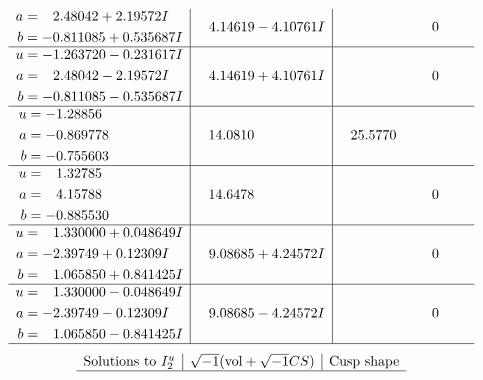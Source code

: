 \documentclass[1p]{elsarticle_modified}
\theoremstyle{definition}
\newcommand{\I}{\sqrt{-1}}
\begin{document}
$$\begin{array}{c|c|c}
\begin{aligned}
a &= \phantom{-}2.48042 + 2.19572 I \\
b &= -0.811085 + 0.535687 I\end{aligned}
 & \phantom{-}4.14619 - 4.10761 I & \phantom{-0.000000 } 0 \\ \hline\begin{aligned}
u &= -1.263720 - 0.231617 I \\
a &= \phantom{-}2.48042 - 2.19572 I \\
b &= -0.811085 - 0.535687 I\end{aligned}
 & \phantom{-}4.14619 + 4.10761 I & \phantom{-0.000000 } 0 \\ \hline\begin{aligned}
u &= -1.28856\phantom{ +0.000000I} \\
a &= -0.869778\phantom{ +0.000000I} \\
b &= -0.755603\phantom{ +0.000000I}\end{aligned}
 & \phantom{-}14.0810\phantom{ +0.000000I} & \phantom{-}25.5770\phantom{ +0.000000I} \\ \hline\begin{aligned}
u &= \phantom{-}1.32785\phantom{ +0.000000I} \\
a &= \phantom{-}4.15788\phantom{ +0.000000I} \\
b &= -0.885530\phantom{ +0.000000I}\end{aligned}
 & \phantom{-}14.6478\phantom{ +0.000000I} & \phantom{-0.000000 } 0 \\ \hline\begin{aligned}
u &= \phantom{-}1.330000 + 0.048649 I \\
a &= -2.39749 + 0.12309 I \\
b &= \phantom{-}1.065850 + 0.841425 I\end{aligned}
 & \phantom{-}9.08685 + 4.24572 I & \phantom{-0.000000 } 0 \\ \hline\begin{aligned}
u &= \phantom{-}1.330000 - 0.048649 I \\
a &= -2.39749 - 0.12309 I \\
b &= \phantom{-}1.065850 - 0.841425 I\end{aligned}
 & \phantom{-}9.08685 - 4.24572 I & \phantom{-0.000000 } 0\\
 \hline 
 \end{array}$$\newpage$$\begin{array}{c|c|c}  
\text{Solutions to }I^u_{2}& \I (\text{vol} + \sqrt{-1}CS) & \text{Cusp shape}\\
 \hline 

\end{array}$$
\end{document}
